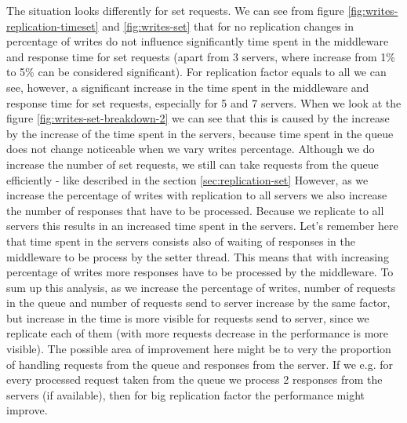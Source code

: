 \documentclass[11pt]{article}
\begin{document}
The situation looks differently for set requests. We can see from figure \ref{fig:writes-replication-timeset} and  \ref{fig:writes-set} that for no replication changes in percentage of writes do not influence significantly time spent in the middleware and response time for set requests (apart from 3 servers, where increase from 1\% to 5\% can be considered significant). For replication factor equals to all we can see, however, a significant increase in the time spent in the middleware and response time for set requests, especially for 5 and 7 servers. When we look at the figure \ref{fig:writes-set-breakdown-2} we can see that this is caused by the increase by the increase of the time spent in the servers, because time spent in the queue does not change noticeable when we vary writes percentage. Although we do increase the number of set requests, we still can take requests from the queue efficiently - like described in the section \ref{sec:replication-set}
%
However, as we increase the percentage of writes with replication to all servers we also increase the number of responses that have to be processed. Because we replicate to all servers this results in an increased time spent in the servers. Let's remember here that time spent in the servers consists also of waiting of responses in the middleware to be process by the setter thread. This means that with increasing percentage of writes more responses have to be processed by the middleware. To sum up this analysis, as we increase the percentage of writes, number of requests in the queue and number of requests send to server increase by the same factor, but increase in the time is more visible for requests send to server, since we replicate each of them (with more requests decrease in the performance is more visible). The possible area of improvement here might be to very the proportion of handling requests from the queue and responses from the server. If we e.g. for every processed request taken from the queue we process 2 responses from the servers (if available), then for big replication factor the performance might improve.
\end{document}
